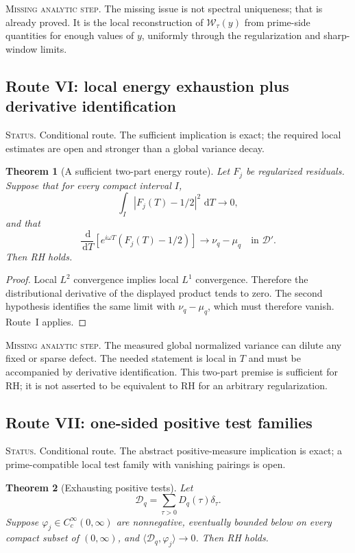 \documentclass[11pt]{amsart}
\numberwithin{equation}{section}
\theoremstyle{plain}
\newtheorem{theorem}{Theorem}[section]
\theoremstyle{definition}
\theoremstyle{remark}
\newcommand{\1}{\mathbf{1}}
\newcommand{\dd}{\,\mathrm{d}}
\newcommand{\statusnote}[1]{%
  \par\smallskip\noindent
  \begingroup\footnotesize\textsc{Status.} #1\endgroup
  \par\smallskip}
\newcommand{\missingnote}[1]{%
  \par\smallskip\noindent
  \begingroup\footnotesize\textsc{Missing analytic step.} #1\endgroup
  \par\smallskip}
\begin{document}
\missingnote{The missing issue is not spectral uniqueness; that is already
proved.  It is the local reconstruction of $\mathcal W_\tau(y)$ from
prime-side quantities for enough values of $y$, uniformly through the
regularization and sharp-window limits.}

\subsection{Route VI: local energy exhaustion plus derivative identification}
\label{subsec:route_energy_local}

\statusnote{Conditional route.  The sufficient implication is exact; the required local estimates are open and stronger than a global variance decay.}
\begin{theorem}[A sufficient two-part energy route]
\label{thm:energy_local_route}
Let $F_j$ be regularized residuals.  Suppose that for every compact interval
$I$,
\begin{equation}
\int_I|F_j(T)-1/2|^2\,\dd T\longrightarrow0,
\label{eq:energy_route_local_L2}
\end{equation}
and that
\begin{equation}
\frac{\dd}{\dd T}
\left[e^{i\omega T}(F_j(T)-1/2)\right]
\longrightarrow
\nu_q-\mu_q
\quad\text{in }\mathcal D'.
\label{eq:energy_route_derivative}
\end{equation}
Then RH holds.
\end{theorem}

\begin{proof}
Local $L^2$ convergence implies local $L^1$ convergence.  Therefore the
distributional derivative of the displayed product tends to zero.  The
second hypothesis identifies the same limit with $\nu_q-\mu_q$, which must
therefore vanish.  Route~I applies.
\end{proof}

\missingnote{The measured global normalized variance can dilute any fixed or
sparse defect.  The needed statement is local in $T$ and must be accompanied
by derivative identification.  This two-part premise is sufficient for RH;
it is not asserted to be equivalent to RH for an arbitrary regularization.}

\subsection{Route VII: one-sided positive test families}
\label{subsec:route_positive_tests}

\statusnote{Conditional route.  The abstract positive-measure implication is exact; a prime-compatible local test family with vanishing pairings is open.}
\begin{theorem}[Exhausting positive tests]
\label{thm:exhausting_positive_tests}
Let
\begin{equation}
\mathcal D_q=\sum_{\tau>0}D_q(\tau)\delta_\tau.
\label{eq:positive_defect_measure_route}
\end{equation}
Suppose $\varphi_j\in C_c^\infty(0,\infty)$ are nonnegative, eventually
bounded below on every compact subset of $(0,\infty)$, and
$\langle\mathcal D_q,\varphi_j\rangle\to0$.  Then RH holds.
\end{theorem}
\end{document}
